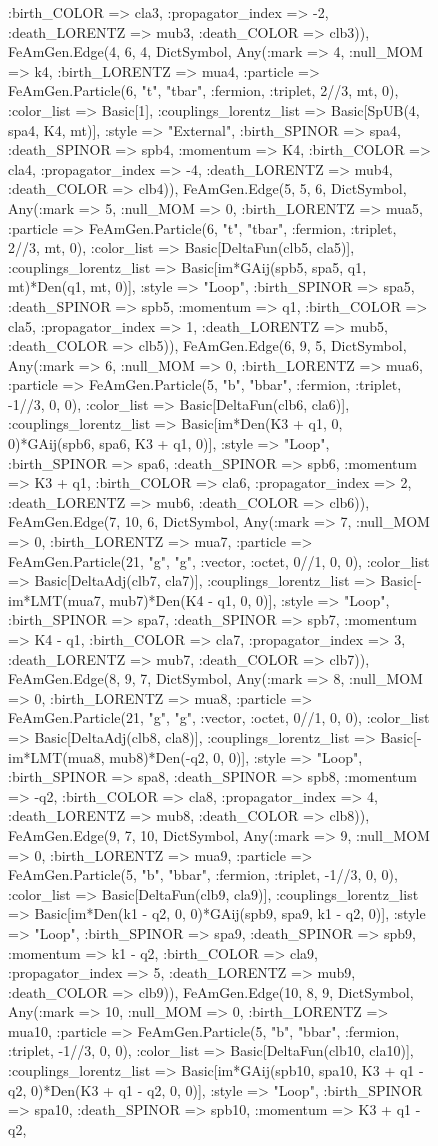\documentclass{revtex4}
\begin{document}
\begin{figure}[!htb]
\begin{center}
{:birth_COLOR => cla3, :propagator_index => -2, :death_LORENTZ => mub3, :death_COLOR => clb3)), FeAmGen.Edge(4, 6, 4, Dict{Symbol, Any}(:mark => 4, :null_MOM => k4, :birth_LORENTZ => mua4, :particle => FeAmGen.Particle(6, "t", "tbar", :fermion, :triplet, 2//3, mt, 0), :color_list => Basic[1], :couplings_lorentz_list => Basic[SpUB(4, spa4, K4, mt)], :style => "External", :birth_SPINOR => spa4, :death_SPINOR => spb4, :momentum => K4, :birth_COLOR => cla4, :propagator_index => -4, :death_LORENTZ => mub4, :death_COLOR => clb4)), FeAmGen.Edge(5, 5, 6, Dict{Symbol, Any}(:mark => 5, :null_MOM => 0, :birth_LORENTZ => mua5, :particle => FeAmGen.Particle(6, "t", "tbar", :fermion, :triplet, 2//3, mt, 0), :color_list => Basic[DeltaFun(clb5, cla5)], :couplings_lorentz_list => Basic[im*GAij(spb5, spa5, q1, mt)*Den(q1, mt, 0)], :style => "Loop", :birth_SPINOR => spa5, :death_SPINOR => spb5, :momentum => q1, :birth_COLOR => cla5, :propagator_index => 1, :death_LORENTZ => mub5, :death_COLOR => clb5)), FeAmGen.Edge(6, 9, 5, Dict{Symbol, Any}(:mark => 6, :null_MOM => 0, :birth_LORENTZ => mua6, :particle => FeAmGen.Particle(5, "b", "bbar", :fermion, :triplet, -1//3, 0, 0), :color_list => Basic[DeltaFun(clb6, cla6)], :couplings_lorentz_list => Basic[im*Den(K3 + q1, 0, 0)*GAij(spb6, spa6, K3 + q1, 0)], :style => "Loop", :birth_SPINOR => spa6, :death_SPINOR => spb6, :momentum => K3 + q1, :birth_COLOR => cla6, :propagator_index => 2, :death_LORENTZ => mub6, :death_COLOR => clb6)), FeAmGen.Edge(7, 10, 6, Dict{Symbol, Any}(:mark => 7, :null_MOM => 0, :birth_LORENTZ => mua7, :particle => FeAmGen.Particle(21, "g", "g", :vector, :octet, 0//1, 0, 0), :color_list => Basic[DeltaAdj(clb7, cla7)], :couplings_lorentz_list => Basic[-im*LMT(mua7, mub7)*Den(K4 - q1, 0, 0)], :style => "Loop", :birth_SPINOR => spa7, :death_SPINOR => spb7, :momentum => K4 - q1, :birth_COLOR => cla7, :propagator_index => 3, :death_LORENTZ => mub7, :death_COLOR => clb7)), FeAmGen.Edge(8, 9, 7, Dict{Symbol, Any}(:mark => 8, :null_MOM => 0, :birth_LORENTZ => mua8, :particle => FeAmGen.Particle(21, "g", "g", :vector, :octet, 0//1, 0, 0), :color_list => Basic[DeltaAdj(clb8, cla8)], :couplings_lorentz_list => Basic[-im*LMT(mua8, mub8)*Den(-q2, 0, 0)], :style => "Loop", :birth_SPINOR => spa8, :death_SPINOR => spb8, :momentum => -q2, :birth_COLOR => cla8, :propagator_index => 4, :death_LORENTZ => mub8, :death_COLOR => clb8)), FeAmGen.Edge(9, 7, 10, Dict{Symbol, Any}(:mark => 9, :null_MOM => 0, :birth_LORENTZ => mua9, :particle => FeAmGen.Particle(5, "b", "bbar", :fermion, :triplet, -1//3, 0, 0), :color_list => Basic[DeltaFun(clb9, cla9)], :couplings_lorentz_list => Basic[im*Den(k1 - q2, 0, 0)*GAij(spb9, spa9, k1 - q2, 0)], :style => "Loop", :birth_SPINOR => spa9, :death_SPINOR => spb9, :momentum => k1 - q2, :birth_COLOR => cla9, :propagator_index => 5, :death_LORENTZ => mub9, :death_COLOR => clb9)), FeAmGen.Edge(10, 8, 9, Dict{Symbol, Any}(:mark => 10, :null_MOM => 0, :birth_LORENTZ => mua10, :particle => FeAmGen.Particle(5, "b", "bbar", :fermion, :triplet, -1//3, 0, 0), :color_list => Basic[DeltaFun(clb10, cla10)], :couplings_lorentz_list => Basic[im*GAij(spb10, spa10, K3 + q1 - q2, 0)*Den(K3 + q1 - q2, 0, 0)], :style => "Loop", :birth_SPINOR => spa10, :death_SPINOR => spb10, :momentum => K3 + q1 - q2, }
\end{center}
\end{figure}
\end{document}
